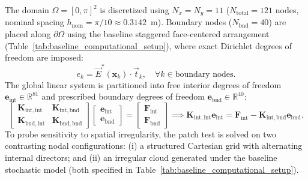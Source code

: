 \documentclass[preprint,12pt]{elsarticle}
\begin{document}
The domain $\Omega = [0, \pi]^2$ is discretized using $N_x = N_y = 11$ ($N_{\mathrm{total}} = 121$ nodes, nominal spacing $h_{\mathrm{nom}} = \pi / 10 \approx 0.3142$~m). Boundary nodes ($N_{\mathrm{bnd}} = 40$) are placed along $\partial\Omega$ using the baseline staggered face-centered arrangement (Table~\ref{tab:baseline_computational_setup}), where exact Dirichlet degrees of freedom are imposed:
\begin{equation}
    e_k = \vec{E}^*(\mathbf{x}_k) \cdot \vec{t}_k, \quad \forall k \in \text{boundary nodes}.
    \label{eq:dirichlet_patch_imposition}
\end{equation}
The global linear system is partitioned into free interior degrees of freedom $\mathbf{e}_{\mathrm{int}} \in \mathbb{R}^{81}$ and prescribed boundary degrees of freedom $\mathbf{e}_{\mathrm{bnd}} \in \mathbb{R}^{40}$:
\begin{equation}
    \begin{bmatrix} \mathbf{K}_{\mathrm{int}, \mathrm{int}} & \mathbf{K}_{\mathrm{int}, \mathrm{bnd}} \\ \mathbf{K}_{\mathrm{bnd}, \mathrm{int}} & \mathbf{K}_{\mathrm{bnd}, \mathrm{bnd}} \end{bmatrix} \begin{bmatrix} \mathbf{e}_{\mathrm{int}} \\ \mathbf{e}_{\mathrm{bnd}} \end{bmatrix} = \begin{bmatrix} \mathbf{F}_{\mathrm{int}} \\ \mathbf{F}_{\mathrm{bnd}} \end{bmatrix} \implies \mathbf{K}_{\mathrm{int}, \mathrm{int}} \mathbf{e}_{\mathrm{int}} = \mathbf{F}_{\mathrm{int}} - \mathbf{K}_{\mathrm{int}, \mathrm{bnd}} \mathbf{e}_{\mathrm{bnd}}.
    \label{eq:patch_test_partitioned_system}
\end{equation}
To probe sensitivity to spatial irregularity, the patch test is solved on two contrasting nodal configurations: (i) a structured Cartesian grid with alternating internal directors; and (ii) an irregular cloud generated under the baseline stochastic model (both specified in Table~\ref{tab:baseline_computational_setup}).
\end{document}
